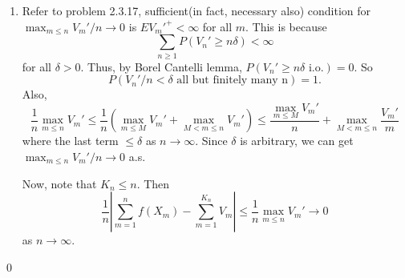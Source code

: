 \begin{problem}[5.6.5]
\begin{enumerate}
		\item Refer to problem 2.3.17, sufficient(in fact, necessary also) condition for $\max_{m \le n} V_m' /n \rightarrow 0$ is $EV_m'^+ <\infty$ for all $m$.
			This is because
			\[
				\sum_{n\ge 1}P(V_n' \ge n\delta) <\infty
			\]
			for all $\delta >0$.
			Thus, by Borel Cantelli lemma, $P(V_n' \ge n\delta \text{ i.o.}) = 0$.
			So
			\[
				P(V_n' /n < \delta \text{ all but finitely many n}) = 1.
			\]
			Also,
			\[
				\frac{1}{n} \max_{m \le n} V_m'
				\le \frac{1}{n}\left( \max_{m\le M}V_m' +\max_{M < m \le n}V_m' \right)
				\le \frac{\max_{m\le M}V_m'}{n}+\max_{M<m\le n} \frac{V_m'}{m}
			\]
			where the last term $\le \delta$ as $n\rightarrow \infty$.
			Since $\delta$ is arbitrary, we can get $\max_{m \le n}V_m'/n \rightarrow 0$ a.s.

			Now, note that $K_n \le n$.
			Then
			\[
				\frac{1}{n}\left \lvert \sum_{m=1}^n f(X_m) - \sum_{m=1}^{K_n}V_m \right \lvert
				\le \frac{1}{n}\max_{m \le n}V_m' \rightarrow 0
			\]
			as $n\rightarrow \infty$.

	\end{enumerate}

	\qed
\end{problem}

